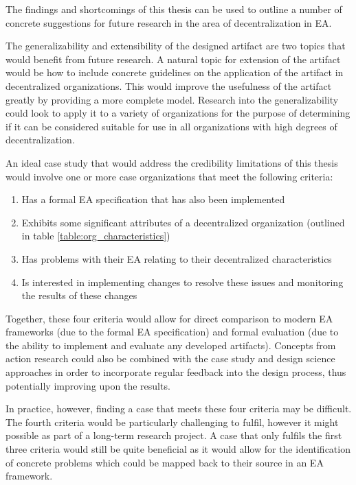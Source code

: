 The findings and shortcomings of this thesis can be used to outline a number of concrete suggestions for future research in the area of decentralization in EA. 

The generalizability and extensibility of the designed artifact are two topics that would benefit from future research. A natural topic for extension of the artifact would be how to include concrete guidelines on the application of the artifact in decentralized organizations. This would improve the usefulness of the artifact greatly by providing a more complete model. Research into the generalizability could look to apply it to a variety of organizations for the purpose of determining if it can be considered suitable for use in all organizations with high degrees of decentralization.

An ideal case study that would address the credibility limitations of this thesis would involve one or more case organizations that meet the following criteria:

\begin{enumerate}
\item Has a formal EA specification that has also been implemented
\item Exhibits some significant attributes of a decentralized organization (outlined in table \ref{table:org_characteristics})
\item Has problems with their EA relating to their decentralized characteristics
\item Is interested in implementing changes to resolve these issues and monitoring the results of these changes
\end{enumerate}

Together, these four criteria would allow for direct comparison to modern EA frameworks (due to the formal EA specification) and formal evaluation (due to the ability to implement and evaluate any developed artifacts). Concepts from action research could also be combined with the case study and design science approaches in order to incorporate regular feedback into the design process, thus potentially improving upon the results. 

In practice, however, finding a case that meets these four criteria may be difficult. The fourth criteria would be particularly challenging to fulfil, however it might possible as part of a long-term research project. A case that only fulfils the first three criteria would still be quite beneficial as it would allow for the identification of concrete problems which could be mapped back to their source in an EA framework. 

